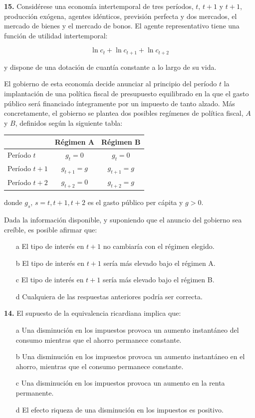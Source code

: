 \documentclass{nuevotema}
\begin{document}
\textbf{15.} Considérese una economía intertemporal de tres períodos, $t$, $t+1$ y $t+1$, producción exógena, agentes idénticos, previsión perfecta y dos mercados, el mercado de bienes y el mercado de bonos. El agente representativo tiene una función de utilidad intertemporal:

\begin{equation*}
\ln c_t + \ln c_{t+1} + \ln c_{t+2}
\end{equation*}

y dispone de una dotación de cuantía constante a lo largo de su vida.

El gobierno de esta economía decide anunciar al principio del período $t$ la implantación de una política fiscal de presupuesto equilibrado en la que el gasto público será financiado íntegramente por un impuesto de tanto alzado. Más concretamente, el gobierno se plantea dos posibles regímenes de política fiscal, $A$ y $B$, definidos según la siguiente tabla:

\begin{center}
\begin{tabular}{l c c}
& Régimen A & Régimen B \\ \hline 
Período $t$ & $g_t = 0$ & $g_t = 0$ \\ \hline 
Período $t+1$ & $g_{t+1} = g$ & $g_{t+1} = g$ \\ \hline 
Período $t+2$ & $g_{t+2} = 0$ & $g_{t+2} = g$ \\ \hline
\end{tabular}
\end{center}

donde $g_s$, $s=t, t+1, t+2$ es el gasto público per cápita y $g >0$.

Dada la información disponible, y suponiendo que el anuncio del gobierno sea creíble, es posible afirmar que:

\begin{itemize}
	\item[a] El tipo de interés en $t+1$ no cambiaría con el régimen elegido.
	\item[b] El tipo de interés en $t+1$ sería más elevado bajo el régimen A.
	\item[c] El tipo de interés en $t+1$ sería más elevado bajo el régimen B.
	\item[d] Cualquiera de las respuestas anteriores podría ser correcta.
\end{itemize}

\textbf{14.} El supuesto de la equivalencia ricardiana implica que:
\begin{itemize}
	\item[a] Una disminución en los impuestos provoca un aumento instantáneo del consumo mientras que el ahorro permanece constante.
	\item[b] Una disminución en los impuestos provoca un aumento instantáneo en el ahorro, mientras que el consumo permanece constante.
	\item[c] Una disminución en los impuestos provoca un aumento en la renta permanente.
	\item[d] El efecto riqueza de una disminución en los impuestos es positivo.
\end{itemize}
\end{document}
